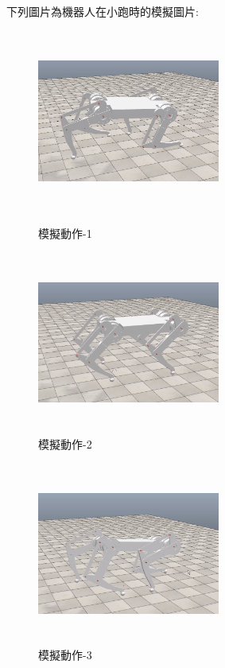 下列圖片為機器人在小跑時的模擬圖片:\
\begin{figure}[htbp]
  \begin{minipage}[t]{0.5\linewidth}
    \centering
    \includegraphics[height=6cm,width=6cm]{模擬動作-1}
    \caption{模擬動作-1}
    \label{模擬動作-1}
  \end{minipage}
  \hfill
  \begin{minipage}[t]{0.5\linewidth}
    \centering
    \includegraphics[height=6cm,width=6cm]{模擬動作-2}
    \caption{模擬動作-2}
    \label{模擬動作-2}
  \end{minipage}
\end{figure}

\begin{figure}[hbt!]
\begin{center}
\includegraphics[height=6cm,width=6cm]{模擬動作-3}
\caption{\Large 模擬動作-3}\label{模擬動作-3}
\end{center}
\end{figure}
\newpage
